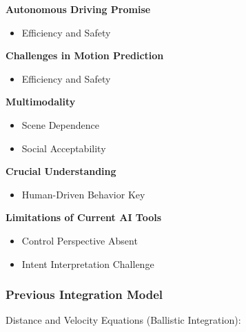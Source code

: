 \begin{frame}
    \textbf{Autonomous Driving Promise}
    \begin{itemize}[]
        \item Efficiency and Safety
    \end{itemize}

    \hfil

    \textbf{Challenges in Motion Prediction}
    \begin{itemize}[]
        \item Efficiency and Safety
    \end{itemize}

    \hfil

    \textbf{Multimodality}
    \begin{itemize}[]
        \item Scene Dependence
        \item Social Acceptability
    \end{itemize}

    \hfil

    \textbf{Crucial Understanding}
    \begin{itemize}[]
        \item Human-Driven Behavior Key
    \end{itemize}

    \hfil

    \textbf{Limitations of Current AI Tools}
    \begin{itemize}[]
        \item Control Perspective Absent
        \item Intent Interpretation Challenge
    \end{itemize}





\end{frame}




\begin{frame}

  \frametitle{Previous Integration Model }
    Distance and Velocity Equations (Ballistic Integration):
\end{frame}

